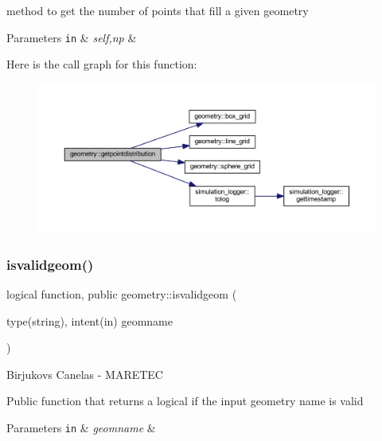 method to get the number of points that fill a given geometry 
\begin{DoxyParams}[1]{Parameters}
\mbox{\tt in}  & {\em self,np} & \\
\hline
\end{DoxyParams}
Here is the call graph for this function\+:\nopagebreak
\begin{figure}[H]
\begin{center}
\leavevmode
\includegraphics[width=350pt]{namespacegeometry_a726dae6e63f052138bd3346de439fbc4_cgraph}
\end{center}
\end{figure}
\mbox{\label{namespacegeometry_a56488a00edf7ba4e670ceffd5c36f13f}} 
\subsubsection{\texorpdfstring{isvalidgeom()}{isvalidgeom()}}
{\footnotesize\ttfamily logical function, public geometry\+::isvalidgeom (\begin{DoxyParamCaption}\item[{type(string), intent(in)}]{geomname }\end{DoxyParamCaption})}



Birjukovs Canelas -\/ M\+A\+R\+E\+T\+EC 

Public function that returns a logical if the input geometry name is valid 
\begin{DoxyParams}[1]{Parameters}
\mbox{\tt in}  & {\em geomname} & \\
\hline
\end{DoxyParams}
\mbox{\label{namespacegeometry_a7d580229bc67448e6389d0beef0c04cb}} 
